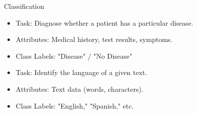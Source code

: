 \documentclass[aspectratio=169]{beamer}
\begin{document}
\begin{frame}{Classification}
\begin{minipage}[t]{0.32\textwidth}
    \end{minipage}
    \hfill
    \begin{minipage}[t]{0.32\textwidth}
        \begin{coloredblock}
            \begin{itemize}
                \item \scriptsize Task: Diagnose whether a patient has a particular disease.
                \item \scriptsize Attributes: Medical history, test results, symptoms.
                \item \scriptsize Class Labels: "Disease" / "No Disease"
            \end{itemize}
        \end{coloredblock}
        \vspace{0.3cm}
        \begin{coloredblock}
            \begin{itemize}
                \item \scriptsize Task: Identify the language of a given text.
                \item \scriptsize Attributes: Text data (words, characters).
                \item \scriptsize Class Labels: "English," "Spanish," etc.
            \end{itemize}
        \end{coloredblock}
        
    \end{minipage}
    \hfill
    \begin{minipage}[t]{0.32\textwidth}


\end{minipage}
\end{frame}
\end{document}
